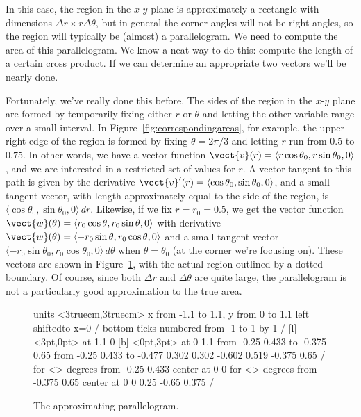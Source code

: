 In this case, the region in the $x$-$y$ plane is approximately a
rectangle with dimensions $\Delta r\times r\Delta\theta$, but in
general the corner angles will not be right angles, so the region will
typically be (almost) a parallelogram. We need to compute the area of
this parallelogram. We know
a neat way to do this: compute the length of a certain cross product.
If we can determine an appropriate two vectors we'll be nearly done.

Fortunately, we've really done this before. The sides of the region in
the $x$-$y$ plane are formed by temporarily fixing either $r$ or
$\theta$ and letting the other variable range over a small interval.
In Figure~\ref{fig:correspondingareas}, for example, the upper right
edge of the region is formed by fixing $\theta=2\pi/3$ and letting $r$
run from $0.5$ to $0.75$. In other words, we have a vector function
$\vect{v}(r)=\langle r\cos\theta_0, r\sin\theta_0, 0\rangle$, and we
are interested in a restricted set of values for $r$. A vector tangent
to this path is given by the derivative $\vect{v}'(r)=\langle
\cos\theta_0, \sin\theta_0, 0\rangle$, and a small tangent vector,
with length approximately equal to the side of the region, is $\langle
\cos\theta_0, \sin\theta_0, 0\rangle\,dr$. Likewise, if we fix
$r=r_0=0.5$, we get the vector function $\vect{w}(\theta)=\langle
r_0\cos\theta, r_0\sin\theta, 0\rangle$ with derivative $\vect{w}(\theta)=\langle -r_0\sin\theta, r_0\cos\theta, 0\rangle$ and a
small tangent vector $\langle -r_0\sin\theta_0, r_0\cos\theta_0,
0\rangle\,d\theta$ when $\theta=\theta_0$ (at the corner we're
focusing on). These vectors are shown in 
Figure~\ref{fig:smallapproximatingparallelogram}, with the actual
region outlined by a dotted boundary. Of course, since both $\Delta r$
and $\Delta\theta$ are quite large, the parallelogram is not a
particularly good approximation to the true area.

\begin{figure}[H]
\centerline{
\vbox{\beginpicture
\normalgraphs
\setcoordinatesystem units <3truecm,3truecm> 
\setplotarea x from -1.1 to 1.1, y from 0 to 1.1
\axis left shiftedto x=0 /
\axis bottom  ticks numbered from -1 to 1 by 1 /
 [l] <3pt,0pt> at 1.1 0
 [b] <0pt,3pt> at 0 1.1
\arrow <5pt> [0.17, 0.5] from  -0.25 0.433  to  -0.375 0.65
\arrow <5pt> [0.17, 0.5] from -0.25 0.433 to -0.477  0.302
\setdashes
{}  0.302 -0.602 0.519 -0.375 0.65 /
\setdotsnear <2pt> for <\totalarclength>
 degrees from -0.25 0.433 center at 0 0
\setdotsnear <2pt> for <\totalarclength>
 degrees from -0.375 0.65 center at 0 0
\setlinear
{} 0.25 -0.65 0.375 /
\endpicture}}
\caption{The approximating parallelogram.}
\label{fig:smallapproximatingparallelogram}
\end{figure}

